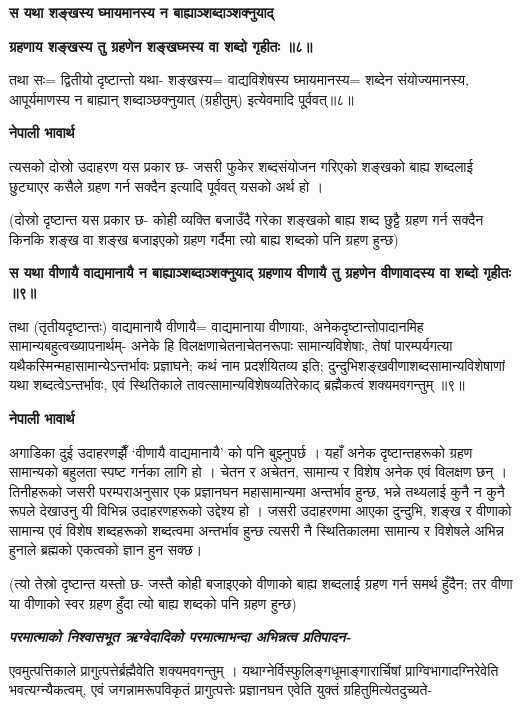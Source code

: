 \documentclass[11pt, a5paper]{article}
\begin{document}
\textbf{स यथा शङ्‍खस्य घ्मायमानस्य न बाह्याञ्शब्दाञ्शक्नुयाद्‍}

\textbf{ग्रहणाय शङ्‍खस्य तु ग्रहणेन शङ्‍खघ्मस्य वा शब्दो गृहीतः ॥८॥}

तथा सः= द्वितीयो दृष्टान्तो यथा- शङ्‍खस्य= वाद्यविशेषस्य घ्मायमानस्य= शब्देन संयोज्यमानस्य, आपूर्यमाणस्य न बाह्यान् शब्दाञ्छक्नुयात् (ग्रहीतुम्) इत्येवमादि पू्र्ववत्॥८॥

\textbf{नेपाली भावार्थ}

त्यसको दोस्रो उदाहरण यस प्रकार छ- जसरी फुकेर शब्दसंयोजन गरिएको शङ्‍खको बाह्य शब्दलाई छुट्याएर कसैले ग्रहण गर्न सक्दैन इत्यादि पूर्ववत् यसको अर्थ हो ।

(दोस्रो दृष्टान्त यस प्रकार छ- कोही व्यक्ति बजाउँदै गरेका शङ्खको बाह्य शब्द छुट्टै ग्रहण गर्न सक्दैन किनकि शङ्ख वा शङ्ख बजाइएको ग्रहण गर्दैमा त्यो बाह्य शब्दको पनि ग्रहण हुन्छ)

\textbf{स यथा वीणायै वाद्यमानायै न बाह्याञ्शब्दाञ्शक्नुयाद् ग्रहणाय वीणायै तु ग्रहणेन वीणावादस्य वा शब्दो गृहीतः ॥९॥}

तथा (तृतीयदृष्टान्तः) वाद्यमानायै वीणायै= वाद्यमानाया वीणायाः, अनेकदृष्टान्तोपादानमिह सामान्यबहुत्वख्यापनार्थम्- अनेके हि विलक्षणाचेतनाचेतनरूपाः सामान्यविशेषाः, तेषां पारम्पर्यगत्या यथैकस्मिन्महासामान्येऽन्तर्भावः प्रज्ञाघने; कथं नाम प्रदर्शयितव्य इति; दुन्दुभिशङ्‍खवीणाशब्दसामान्यविशेषाणां यथा शब्दत्वेऽन्तर्भावः, एवं स्थितिकाले तावत्सामान्यविशेषव्यतिरेकाद् ब्रह्मैकत्वं शक्यमवगन्तुम् ॥९॥

\textbf{नेपाली भावार्थ}

अगाडिका दुई उदाहरणझैँ ‘वीणायै वाद्यमानायै’ को पनि बुझ्नुपर्छ । यहाँ अनेक दृष्टान्तहरूको ग्रहण सामान्यको बहुलता स्पष्ट गर्नका लागि हो । चेतन र अचेतन, सामान्य र विशेष अनेक एवं विलक्षण छन् । तिनीहरूको जसरी परम्पराअनुसार एक प्रज्ञानघन महासामान्यमा अन्तर्भाव हुन्छ, भन्ने तथ्यलाई कुनै न कुनै रूपले देखाउनु यी विभिन्न उदाहरणहरूको उद्देश्य हो । जसरी उदाहरणमा आएका दुन्दुभि, शङ्ख र वीणाको सामान्य एवं विशेष शब्दहरूको शब्दत्वमा अन्तर्भाव हुन्छ त्यसरी नै स्थितिकालमा सामान्य र विशेषले अभिन्न हुनाले ब्रह्मको एकत्वको ज्ञान हुन सक्छ।

(त्यो तेस्रो दृष्टान्त यस्तो छ- जस्तै कोही बजाइएको वीणाको बाह्य शब्दलाई ग्रहण गर्न समर्थ हुँदैन; तर वीणा या वीणाको स्वर ग्रहण हुँदा त्यो बाह्य शब्दको पनि ग्रहण हुन्छ)

\textit{\textbf{परमात्माको निश्वासभूत ऋग्वेदादिको परमात्माभन्दा अभिन्नत्व प्रतिपादन-}}

एवमुत्पत्तिकाले प्रागुत्पत्तेर्ब्रह्मैवेति शक्यमवगन्तुम् । यथाग्नेर्विस्फुलिङ्गधूमाङ्गारार्चिषां प्राग्विभागादग्निरेवेति भवत्यग्न्यैकत्वम्, एवं जगन्नामरूपविकृतं प्रागुत्पत्तेः प्रज्ञानघन एवेति युक्तं ग्रहितुमित्येतदुच्यते-
\end{document}
